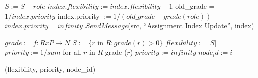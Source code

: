 \documentclass[11pt]{article}
\begin{document}
\begin{algorithmic}
		\State $S := S - role$
		\State $index.flexibility := index.flexibility - 1$
			\State old\_grade = $1 / index.priority$
			\State index.priority $:= 1 / (old\_grade - grade(role))$
		\Else
			\State $index.priority = infinity$
		\EndIf
	\EndIf
	\State $SendMessage$(src, ``Assignment Index Update'', index)
\EndFunction
\end{algorithmic}

\begin{algorithmic}
	\State $grade :=  f: R x P \rightarrow N$
	\State $S := \{r$ in $R :  grade (r) > 0\}$
        \State $flexibility := | S |$
        		\State $priority := 1 / sum$ for all $r$ in $R$ grade ($r$)
	\Else
		\State $ priority := infinity$
        \EndIf
        \State $node_id := i$

	\Return (flexibility, priority, node\_id)
\EndFunction
\end{algorithmic}
\end{document}
